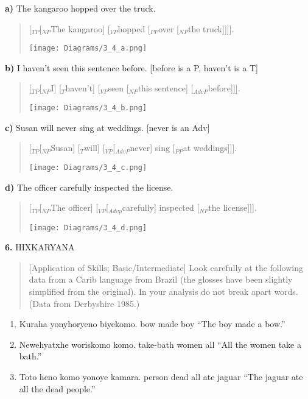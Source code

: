 \documentclass[11pt,notitlepage]{article}
\newcommand{\question}[2]{\textbf{#1.} #2}
\newcommand{\subquestion}[2]{\par\hspace{0.5cm} \textbf{#1)} #2}
\begin{document}
\subquestion{a}{The kangaroo hopped over the truck.}

\begin{quote}
 [$_{TP}$[$_{NP}$The kangaroo] [$_{VP}$hopped [$_{PP}$over [$_{NP}$the truck]]]].

\texttt{[image: Diagrams/3\_4\_a.png]}
\end{quote}

\subquestion{b}{I haven’t seen this sentence before. [before is a P,
  haven’t is a T]}

\begin{quote}
  [$_{TP}$[$_{NP}$I] [$_{T}$haven't] [$_{VP}$seen [$_{NP}$this sentence] [$_{AdvP}$before]]].

\texttt{[image: Diagrams/3\_4\_b.png]}
\end{quote}

\subquestion{c}{Susan will never sing at weddings. [never is an Adv]}

\begin{quote}
[$_{TP}$[$_{NP}$Susan] [$_{T}$will] [$_{VP}$[$_{AdvP}$never] sing [$_{PP}$at weddings]]].

\texttt{[image: Diagrams/3\_4\_c.png]}
\end{quote}

\subquestion{d}{The officer carefully inspected the license.}

\begin{quote}
[$_{TP}$[$_{NP}$The officer] [$_{VP}$[$_{Advp}$carefully] inspected [$_{NP}$the license]]].

\texttt{[image: Diagrams/3\_4\_d.png]}
\end{quote}


\question{6}{HIXKARYANA}
\begin{quote}
[Application of Skills; Basic/Intermediate]
Look carefully at the following data from a Carib language from Brazil
(the glosses have been slightly simplified from the original). In your
analysis do not break apart words. (Data from Derbyshire 1985.)
\end{quote}

\begin{enumerate}
\item Kuraha yonyhoryeno biyekomo. bow made boy “The boy
  made a bow.”
\item Newehyatxhe woriskomo komo. take-bath women all “All
  the women take a bath.”
\item Toto heno komo yonoye kamara. person dead all ate jaguar “The jaguar ate all the dead people.”
\end{enumerate}
\end{document}
